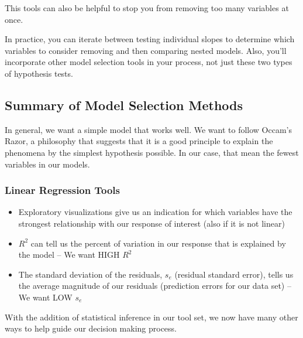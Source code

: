 \documentclass[
]{book}
\providecommand{\tightlist}{%
  \setlength{\itemsep}{0pt}\setlength{\parskip}{0pt}}
\begin{document}
This tools can also be helpful to stop you from removing too many variables at once.

In practice, you can iterate between testing individual slopes to determine which variables to consider removing and then comparing nested models. Also, you'll incorporate other model selection tools in your process, not just these two types of hypothesis tests.

\hypertarget{summary-of-model-selection-methods}{%
\subsection{Summary of Model Selection Methods}\label{summary-of-model-selection-methods}}

In general, we want a simple model that works well. We want to follow Occam's Razor, a philosophy that suggests that it is a good principle to explain the phenomena by the simplest hypothesis possible. In our case, that mean the fewest variables in our models.

\hypertarget{linear-regression-tools}{%
\subsubsection{Linear Regression Tools}\label{linear-regression-tools}}

\begin{itemize}
\tightlist
\item
  Exploratory visualizations give us an indication for which variables have the strongest relationship with our response of interest (also if it is not linear)
\item
  \(R^2\) can tell us the percent of variation in our response that is explained by the model -- We want HIGH \(R^2\)
\item
  The standard deviation of the residuals, \(s_e\) (residual standard error), tells us the average magnitude of our residuals (prediction errors for our data set) -- We want LOW \(s_e\)
\end{itemize}

With the addition of statistical inference in our tool set, we now have many other ways to help guide our decision making process.
\end{document}
